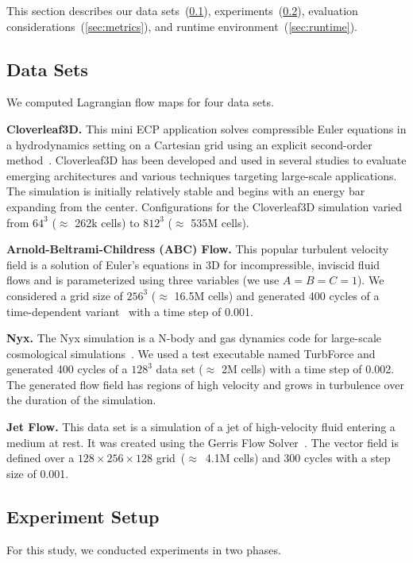 This section describes our data sets~(\ref{sec:datasets}), experiments~(\ref{sec:experiments}), evaluation considerations~(\ref{sec:metrics}), and runtime environment~(\ref{sec:runtime}).
%
\subsection{Data Sets}
\label{sec:datasets}
We computed Lagrangian flow maps for four data sets.

\textbf{Cloverleaf3D.} This mini ECP application solves compressible Euler equations in a hydrodynamics setting on a Cartesian grid using an explicit second-order method~\cite{mallinson2013cloverleaf}.
%
Cloverleaf3D has been developed and used in several studies to evaluate emerging architectures and various techniques targeting large-scale applications.
%
The simulation is initially relatively stable and begins with an energy bar expanding from the center.
%
Configurations for the Cloverleaf3D simulation varied from $64^{3}$ ($\approx$ 262k cells) to $812^{3}$ ($\approx$ 535M cells).

\textbf{Arnold-Beltrami-Childress (ABC) Flow.} This popular turbulent velocity field is a solution of Euler's equations in 3D for incompressible, inviscid fluid flows and is parameterized using three variables (we use $A=B=C=1$). 
%
%
We considered a grid size of $256^{3}$ ($\approx$ 16.5M cells) and generated 400 cycles of a time-dependent variant~\cite{brummell2001linear} with a time step of 0.001.

\textbf{Nyx.} The Nyx simulation is a N-body and gas dynamics code for large-scale cosmological simulations~\cite{almgren2013nyx}. 
%
We used a test executable named TurbForce and generated 400 cycles of a $128^3$ data set ($\approx$ 2M cells) with a time step of 0.002.
%
The generated flow field has regions of high velocity and grows in turbulence over the duration of the simulation. 

\textbf{Jet Flow.} This data set is a simulation of a jet of high-velocity fluid entering a medium at rest. 
%
It was created using the Gerris Flow Solver~\cite{popinet2003gerris}.
%
The vector field is defined over a $128\times256\times128$ grid~($\approx$~4.1M cells) and 300 cycles with a step size of 0.001.
%
\subsection{Experiment Setup}
\label{sec:experiments}
For this study, we conducted experiments in two phases. 

